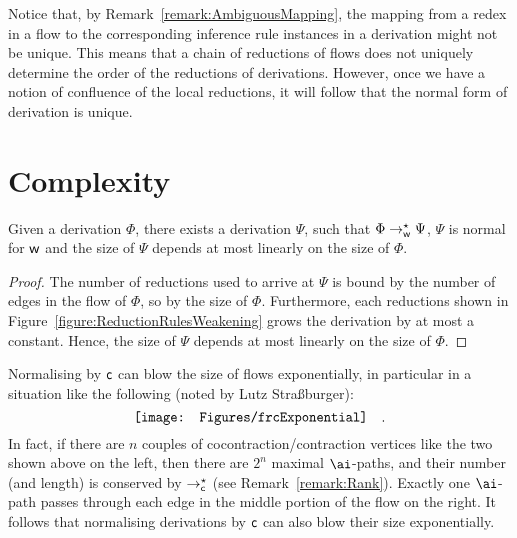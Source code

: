 \begin{remark}
Notice that, by Remark~\vref{remark:AmbiguousMapping}, the mapping from a redex in a flow to the corresponding inference rule instances in a derivation might not be unique. This means that a chain of reductions of flows does not uniquely determine the order of the reductions of derivations. However, once we have a notion of confluence of the local reductions, it will follow that the normal form of derivation is unique.
\end{remark}

\section{Complexity}\label{section:FlowRewriteComplexity}

\begin{proposition}\label{proposition:SizeWeakeningReduction}
Given a derivation $\Phi$, there exists a derivation $\Psi$, such that $\Phi\to_{\mathsf w}^\star\Psi$, $\Psi$ is normal for ${\mathsf w}$ and the size of $\Psi$ depends at most linearly on the size of $\Phi$.
\end{proposition}

\begin{proof}
The number of reductions used to arrive at $\Psi$ is bound by the number of edges in the flow of $\Phi$, so by the size of $\Phi$. Furthermore, each reductions shown in Figure~\vref{figure:ReductionRulesWeakening} grows the derivation by at most a constant. Hence, the size of $\Psi$ depends at most linearly on the size of $\Phi$.
\end{proof}

\begin{remark}\label{remark:RewriteContractionExponential}
Normalising by ${\mathsf c}$ can blow the size of flows exponentially, in particular in a situation like the following (noted by Lutz Stra{\ss}burger):
\[
\vcenter{\hbox{\texttt{[image: Figures/frcExponential]}}}
\quad.
\]
In fact, if there are $n$ couples of cocontraction/contraction vertices like the two shown above on the left, then there are $2^n$ maximal $\ai$-paths, and their number (and length) is conserved by $\to_{\mathsf c}^\star$ (see Remark~\vref{remark:Rank}). Exactly one $\ai$-path passes through each edge in the middle portion of the flow on the right. It follows that normalising derivations by ${\mathsf c}$ can also blow their size exponentially.
\end{remark}
